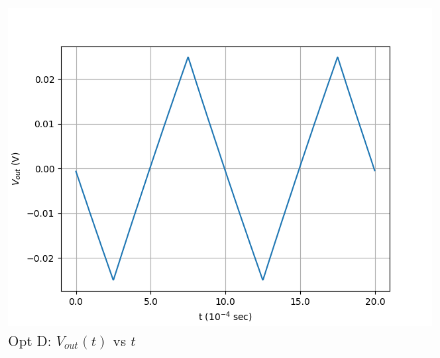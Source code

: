 \documentclass[journal,12pt,twocolumn]{IEEEtran}
\theoremstyle{remark}
\begin{document}
\begin{enumerate}
\begin{figure}[!h]
        \includegraphics[width = \columnwidth]{2023/PH/37/figs/opt_d_res.png}
        \caption{Opt D: $V_{out}(t)$ vs $t$}
        \label{fig:opt_d_res_gate.ph.23.37}
    \end{figure}
\end{enumerate}
\end{document}
